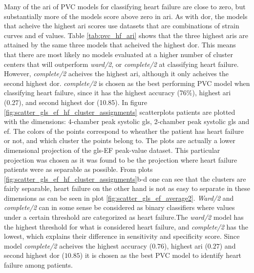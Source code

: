 Many of the \acrshort{ari} of PVC models for classifying heart failure are close to zero, but substantially more of the models score above zero in \acrshort{ari}. As with \acrshort{dor}, the models that acheive the highest \acrshort{ari} scores use datasets that are combinations of strain curves and \acrshort{ef} values. Table \ref{tab:pvc_hf_ari} shows that the three highest \acrshort{ari}s are attained by the same three models that acheived the highest \acrshort{dor}. This means that there are most likely no models evaluated at a higher number of cluster centers that will outperform \textit{ward/2}, or \textit{complete/2} at classifying heart failure. However, \textit{complete/2} acheives the highest \acrshort{ari}, although it only acheives the second highest \acrshort{dor}. \textit{complete/2} is chosen as the best performing PVC model when classifying heart failure, since it has the highest accuracy (76$\%$), highest \acrshort{ari} (0.27), and second highest \acrshort{dor} (10.85). In figure \ref{fig:scatter_gls_ef_hf_cluster_assignments} scatterplots patients are plotted with the dimensions: 4-chamber peak systolic \acrshort{gls}, 2-chamber peak systolic \acrshort{gls} and \acrshort{ef}. The colors of the points correspond to wheather the patient has heart failure or not, and which cluster the points belong to. The plots are actually a lower dimensional projection of the \acrshort{gls}-EF peak-value dataset. This particular projection was chosen as it was found to be the projection where heart failure patients were as separable as possible. From plots \ref{fig:scatter_gls_ef_hf_cluster_assignments}b-d one can see that the clusters are fairly separable, heart failure on the other hand is not as easy to separate in these dimensions as can be seen in plot \ref{fig:scatter_gls_ef_average2}. \textit{Ward/2} and \textit{complete/2} can in some sense be considered as binary classifiers where values under a certain threshold are categorized as heart failure.The \textit{ward/2} model has the highest threshold for what is considered heart failure, and \textit{complete/2} has the lowest, which explains their difference in sensitivity and specificity score. Since model \textit{complete/2} acheives the highest accuracy ($0.76$), highest \acrshort{ari} ($0.27$) and second highest \acrshort{dor} ($10.85$) it is chosen as the best PVC model to identify heart failure among patients. \bigskip

